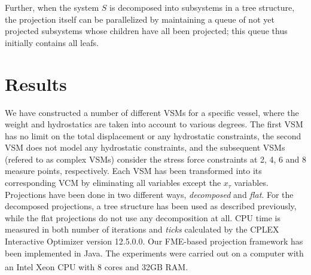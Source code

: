 \documentclass{llncs}
\begin{document}
Further, when the system $S$ is decomposed into subsystems in a tree structure, the projection itself can be parallelized by maintaining a queue of not yet projected subsystems whose children have all been projected; this queue thus initially contains all leafs. 
  
\section{Results}\label{sec:results}
We have constructed a number of different VSMs for a specific vessel, where the weight and hydrostatics are taken into account to various degrees. The first VSM has no limit on the total displacement or any hydrostatic constraints, the second VSM does not model any hydrostatic constraints, and the subsequent VSMs (refered to as complex VSMs) consider the stress force  constraints at 2, 4, 6 and 8 measure points, respectively. 
Each VSM has been transformed into its corresponding VCM by eliminating all variables except the $x_\tau$ variables. Projections have been done in two different ways, \emph{decomposed} and \emph{flat}. For the decomposed projections, a tree structure has been used as described previously, while the flat projections do not use any decomposition at all. CPU time is measured in both number of iterations and \emph{ticks} calculated by the CPLEX Interactive Optimizer version 12.5.0.0. Our FME-based projection framework has been implemented in Java. The experiments were carried out on a computer with an {Intel\textsuperscript{\textregistered} Xeon\textsuperscript{\textregistered} CPU with 8 cores and 32GB RAM.}
\end{document}

